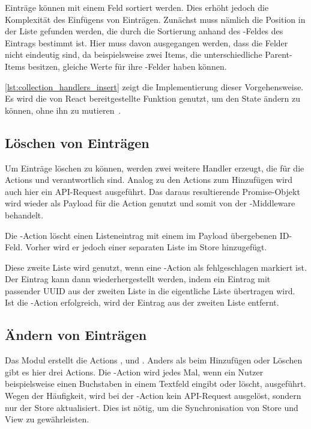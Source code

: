 Einträge können mit einem Feld  sortiert werden.  Dies erhöht jedoch
die Komplexität des Einfügens von Einträgen.  Zunächst muss nämlich die
Position in der Liste gefunden werden, die durch die Sortierung anhand des
-Feldes des Eintrags bestimmt ist.  Hier muss davon ausgegangen
werden, dass die Felder nicht eindeutig sind, da beispielsweise zwei Items, die
unterschiedliche Parent-Items besitzen, gleiche Werte für ihre
-Felder haben können.

\cref{lst:collection_handlers_insert} zeigt die Implementierung dieser
Vorgehensweise.  Es wird die von React bereitgestellte Funktion 
genutzt, um den State ändern zu können, ohne ihn zu mutieren~\cite{update}.



\subsection{Löschen von Einträgen}
\label{ssec:fc_aendern_von_eintraegen}

Um Einträge löschen zu können, werden zwei weitere Handler erzeugt, die für die
Actions  und
 verantwortlich sind.  Analog zu den Actions
zum Hinzufügen wird auch hier ein API-Request ausgeführt.  Das daraus
resultierende Promise-Objekt wird wieder als Payload für die Action genutzt und
somit von der -Middleware behandelt.

Die -Action löscht einen Listeneintrag mit einem im Payload
übergebenen ID-Feld.  Vorher wird er jedoch einer separaten Liste im Store
hinzugefügt.

Diese zweite Liste wird genutzt, wenn eine -Action als
fehlgeschlagen markiert ist.  Der Eintrag kann dann wiederhergestellt werden,
indem ein Eintrag mit passender UUID aus der zweiten Liste in die eigentliche
Liste übertragen wird.  Ist die -Action erfolgreich, wird der
Eintrag aus der zweiten Liste entfernt.

\subsection{Ändern von Einträgen}
\label{ssec:fc_aendern_von_eintraegen}

Das Modul erstellt die Actions ,
 und .
Anders als beim Hinzufügen oder Löschen gibt es hier drei Actions.  Die
-Action wird jedes Mal, wenn ein Nutzer beispielsweise einen
Buchstaben in einem Textfeld eingibt oder löscht, ausgeführt.  Wegen der
Häufigkeit, wird bei der -Action kein API-Request ausgelöst,
sondern nur der Store aktualisiert.  Dies ist nötig, um die Synchronisation von
Store und View zu gewährleisten.


